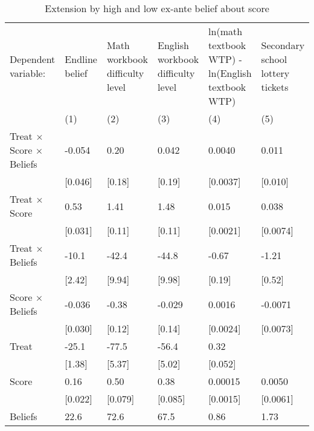 \documentclass{article}
\begin{document}
\begin{table}[h!]\ContinuedFloat
    \centering
    \caption{Extension by high and low ex-ante belief about score}
 \begin{adjustbox}{width=\textwidth}
 \begin{tabular}{p{5cm} p{2.5cm} p{2.5cm} p{2.5cm} p{2.5cm} p{2.5cm}}

\toprule
Dependent variable: & Endline belief & Math workbook difficulty level & English workbook difficulty level & ln(math textbook WTP) - ln(English textbook WTP) & Secondary school lottery tickets\\
 &  (1) &  (2) & (3) &  (4) & (5)\\
 
\midrule
\addlinespace
Treat $\times$ Score $\times$ Beliefs&      -0.054&        0.20&       0.042&      0.0040&       0.011\\
                    &     [0.046]&      [0.18]&      [0.19]&    [0.0037]&     [0.010]\\
\addlinespace
Treat $\times$ Score&        0.53&        1.41&        1.48&       0.015&       0.038\\
                    &     [0.031]&      [0.11]&      [0.11]&    [0.0021]&    [0.0074]\\
\addlinespace
Treat $\times$ Beliefs&       -10.1&       -42.4&       -44.8&       -0.67&       -1.21\\
                    &      [2.42]&      [9.94]&      [9.98]&      [0.19]&      [0.52]\\
\addlinespace
Score $\times$ Beliefs&      -0.036&       -0.38&      -0.029&      0.0016&     -0.0071\\
                    &     [0.030]&      [0.12]&      [0.14]&    [0.0024]&    [0.0073]\\
\addlinespace
Treat               &       -25.1&       -77.5&       -56.4&        0.32&            \\
                    &      [1.38]&      [5.37]&      [5.02]&     [0.052]&            \\
\addlinespace
Score               &        0.16&        0.50&        0.38&     0.00015&      0.0050\\
                    &     [0.022]&     [0.079]&     [0.085]&    [0.0015]&    [0.0061]\\
\addlinespace
Beliefs             &        22.6&        72.6&        67.5&        0.86&        1.73\\

\end{tabular}
\end{adjustbox}
\end{table}
\end{document}
